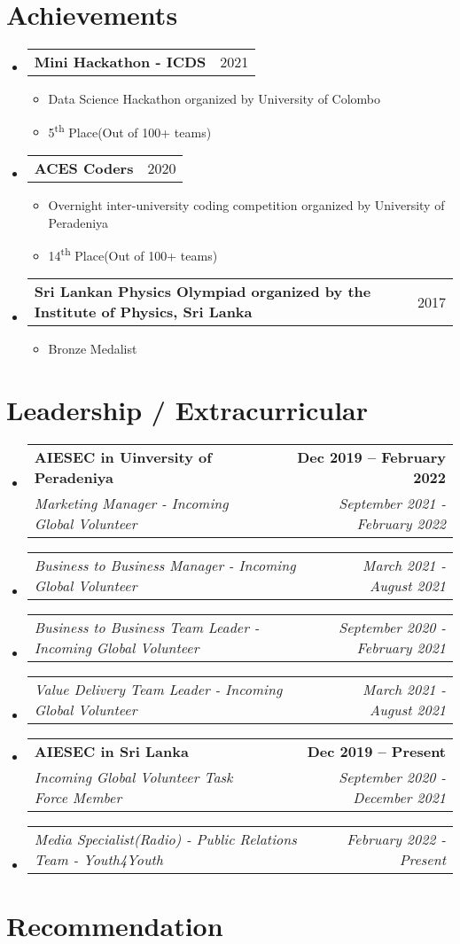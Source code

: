 \documentclass[letterpaper,11pt]{article}
\makeatletter
\newcommand{\resumeSubheading}[4]{
  \vspace{-2pt}\item
    \begin{tabular*}{1.0\textwidth}[t]{l@{\extracolsep{\fill}}r}
      \textbf{#1} & \textbf{\small #2} \\
      \textit{\small#3} & \textit{\small #4} \\
    \end{tabular*}\vspace{-7pt}
}
\newcommand{\resumeSubSubheading}[2]{
    \item
    \begin{tabular*}{1\textwidth}{l@{\extracolsep{\fill}}r}
      \textit{\small#1} & \textit{\small #2} \\
    \end{tabular*}\vspace{-7pt}
}
\newcommand{\resumeListHeading}[2]{
    \item
    \begin{tabular*}{1.001\textwidth}{l@{\extracolsep{\fill}}r}
      \small#1 & {\small #2}\\
    \end{tabular*}\vspace{-15pt}
}
\newcommand{\resumeSubHeadingListStart}{\begin{itemize}[leftmargin=0.0in, label={}]}
\newcommand{\resumeSubHeadingListEnd}{\end{itemize}}
\makeatother
\begin{document}
\section{Achievements}
    \resumeSubHeadingListStart
        \resumeListHeading{ \textbf{Mini Hackathon - ICDS} }{2021}
        \vspace*{3.0\multicolsep}
        \begin{itemize}[ itemsep=-2pt]
          \item Data Science Hackathon organized by University of Colombo
          \item 5\textsuperscript{th} Place(Out of 100+ teams)
        \end{itemize}
        \vspace{-20pt}
        \resumeListHeading{ \textbf{ACES Coders} }{2020}
        \vspace*{3.0\multicolsep}
        \begin{itemize}[ itemsep=-2pt]
          \item Overnight inter-university coding competition organized by University of Peradeniya
          \item 14\textsuperscript{th} Place(Out of 100+ teams)
        \end{itemize}
        \vspace{-20pt}
        \resumeListHeading{ \textbf{Sri Lankan Physics Olympiad organized by the Institute of Physics, Sri Lanka} }{2017}
        \vspace*{3.0\multicolsep}
        \begin{itemize}[ itemsep=-2pt]
          \item Bronze Medalist
        \end{itemize}
        
    \resumeSubHeadingListEnd
\vspace{-13pt}

\section{Leadership / Extracurricular}
    \resumeSubHeadingListStart
        \resumeSubheading{AIESEC in Uinversity of Peradeniya}{Dec 2019 -- February 2022}{Marketing Manager - Incoming Global Volunteer}{September 2021 - February 2022}
        \resumeSubSubheading{Business to Business Manager - Incoming Global Volunteer}{March 2021 - August 2021}
        \resumeSubSubheading{Business to Business Team Leader - Incoming Global Volunteer}{September 2020 - February 2021}
        \resumeSubSubheading{Value Delivery Team Leader - Incoming Global Volunteer}{March 2021 - August 2021}
        \resumeSubheading{AIESEC in Sri Lanka}{Dec 2019 -- Present}{Incoming Global Volunteer Task Force Member}{September 2020 - December 2021}
        \resumeSubSubheading{Media Specialist(Radio) - Public Relations Team - Youth4Youth}{February 2022 - Present}
    \resumeSubHeadingListEnd
    
\section{Recommendation}
\end{document}
